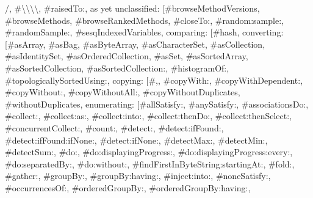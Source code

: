 {/\textquotedbl{}, \textquotedbl{}\#\allowbreak\textbackslash \allowbreak\textbackslash \allowbreak\textbackslash \allowbreak\textbackslash \textquotedbl{}, \textquotedbl{}\#raisedTo:\textquotedbl{}{]}, \textquotedbl{}as yet unclassified\textquotedbl{}: {[}\textquotedbl{}\#browseMethodVersions\textquotedbl{}, \textquotedbl{}\#browseMethods\textquotedbl{}, \textquotedbl{}\#browseRankedMethods\textquotedbl{}, \textquotedbl{}\#closeTo:\textquotedbl{}, \textquotedbl{}\#random:sample:\textquotedbl{}, \textquotedbl{}\#randomSample:\textquotedbl{}, \textquotedbl{}\#sesqIndexedVariables\textquotedbl{}{]}, \textquotedbl{}comparing\textquotedbl{}: {[}\textquotedbl{}\#hash\textquotedbl{}{]}, \textquotedbl{}converting\textquotedbl{}: {[}\textquotedbl{}\#asArray\textquotedbl{}, \textquotedbl{}\#asBag\textquotedbl{}, \textquotedbl{}\#asByteArray\textquotedbl{}, \textquotedbl{}\#asCharacterSet\textquotedbl{}, \textquotedbl{}\#asCollection\textquotedbl{}, \textquotedbl{}\#asIdentitySet\textquotedbl{}, \textquotedbl{}\#asOrderedCollection\textquotedbl{}, \textquotedbl{}\#asSet\textquotedbl{}, \textquotedbl{}\#asSortedArray\textquotedbl{}, \textquotedbl{}\#asSortedCollection\textquotedbl{}, \textquotedbl{}\#asSortedCollection:\textquotedbl{}, \textquotedbl{}\#histogramOf:\textquotedbl{}, \textquotedbl{}\#topologicallySortedUsing:\textquotedbl{}{]}, \textquotedbl{}copying\textquotedbl{}: {[}\textquotedbl{}\#,\textquotedbl{}, \textquotedbl{}\#copyWith:\textquotedbl{}, \textquotedbl{}\#copyWithDependent:\textquotedbl{}, \textquotedbl{}\#copyWithout:\textquotedbl{}, \textquotedbl{}\#copyWithoutAll:\textquotedbl{}, \textquotedbl{}\#copyWithoutDuplicates\textquotedbl{}, \textquotedbl{}\#withoutDuplicates\textquotedbl{}{]}, \textquotedbl{}enumerating\textquotedbl{}: {[}\textquotedbl{}\#allSatisfy:\textquotedbl{}, \textquotedbl{}\#anySatisfy:\textquotedbl{}, \textquotedbl{}\#associationsDo:\textquotedbl{}, \textquotedbl{}\#collect:\textquotedbl{}, \textquotedbl{}\#collect:as:\textquotedbl{}, \textquotedbl{}\#collect:into:\textquotedbl{}, \textquotedbl{}\#collect:thenDo:\textquotedbl{}, \textquotedbl{}\#collect:thenSelect:\textquotedbl{}, \textquotedbl{}\#concurrentCollect:\textquotedbl{}, \textquotedbl{}\#count:\textquotedbl{}, \textquotedbl{}\#detect:\textquotedbl{}, \textquotedbl{}\#detect:ifFound:\textquotedbl{}, \textquotedbl{}\#detect:ifFound:ifNone:\textquotedbl{}, \textquotedbl{}\#detect:ifNone:\textquotedbl{}, \textquotedbl{}\#detectMax:\textquotedbl{}, \textquotedbl{}\#detectMin:\textquotedbl{}, \textquotedbl{}\#detectSum:\textquotedbl{}, \textquotedbl{}\#do:\textquotedbl{}, \textquotedbl{}\#do:displayingProgress:\textquotedbl{}, \textquotedbl{}\#do:displayingProgress:every:\textquotedbl{}, \textquotedbl{}\#do:separatedBy:\textquotedbl{}, \textquotedbl{}\#do:without:\textquotedbl{}, \textquotedbl{}\#findFirstInByteString:startingAt:\textquotedbl{}, \textquotedbl{}\#fold:\textquotedbl{}, \textquotedbl{}\#gather:\textquotedbl{}, \textquotedbl{}\#groupBy:\textquotedbl{}, \textquotedbl{}\#groupBy:having:\textquotedbl{}, \textquotedbl{}\#inject:into:\textquotedbl{}, \textquotedbl{}\#noneSatisfy:\textquotedbl{}, \textquotedbl{}\#occurrencesOf:\textquotedbl{}, \textquotedbl{}\#orderedGroupBy:\textquotedbl{}, \textquotedbl{}\#orderedGroupBy:having:\textquotedbl{}, }

